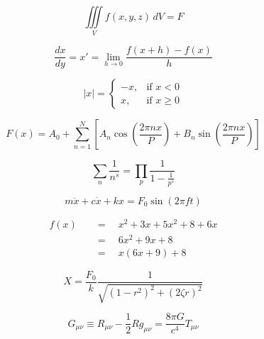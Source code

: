 \documentclass{article}  %
\begin{document}
\begin{equation*}        %
\iiint\limits_V f(x,y,z)\,dV = F   %
\end{equation*}          %


\begin{equation*}        %
\frac{dx}{dy}=x'=\lim_{h \to 0}\frac{f(x+h)-f(x)}{h}  %
\end{equation*}          %


\begin{equation*}        %
|x|=\begin{cases}
-x, & \text{if $x < 0$}\\   %
x, & \text{if $x \geq 0$} 
\end{cases}
\end{equation*}          %


\begin{equation*}        %
F(x)= A_0 + \sum_{n=1}^N\left[ A_n\cos{\left(\frac{2\pi nx}{P}\right)}+B_n\sin{\left(\frac{2\pi nx}{P}\right)}\right]  %
\end{equation*}          %


\begin{equation*}        %
\sum_n \frac{1}{n^s}=\prod_p \frac{1}{1-\frac{1}{p^s}}
\end{equation*}          %


\begin{equation*}        %
m\ddot{x}+c\dot{x}+kx=F_0\sin(2\pi ft)
\end{equation*}          %


\begin{align*}          %
f(x)\quad &=\quad x^2 + 3x + 5x^2 +8 +6x\\  %
&=\quad 6x^2 +9x +8\\
&=\quad x(6x+9)+8
\end{align*}

$$
X=\frac{F_0}{k}\frac{1}{\sqrt{(1-r^2)^2+(2\zeta r)^2}}
$$

\begin{equation*}        %
G_{\mu\nu} \equiv R_{\mu\nu}-\frac{1}{2}Rg_{\mu\nu}=\frac{8\pi G}{c^4}T_{\mu\nu}
\end{equation*}\\        %
\end{document}
